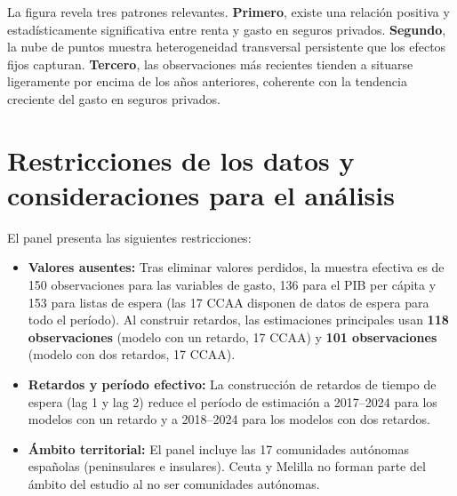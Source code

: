 La figura revela tres patrones relevantes. \textbf{Primero}, existe una relación
positiva y estadísticamente significativa entre renta y gasto en seguros privados.
\textbf{Segundo}, la nube de puntos muestra heterogeneidad transversal persistente
que los efectos fijos capturan. \textbf{Tercero}, las observaciones más recientes
tienden a situarse ligeramente por encima de los años anteriores, coherente con la
tendencia creciente del gasto en seguros privados.

\section{Restricciones de los datos y consideraciones para el análisis}

El panel presenta las siguientes restricciones:

\begin{itemize}
  \item \textbf{Valores ausentes:} Tras eliminar valores perdidos, la muestra
    efectiva es de 150 observaciones para las variables de gasto, 136 para el PIB
    per cápita y 153 para listas de espera (las 17 CCAA disponen de datos de
    espera para todo el período). Al construir retardos, las estimaciones
    principales usan \textbf{118 observaciones} (modelo con un retardo, 17 CCAA)
    y \textbf{101 observaciones} (modelo con dos retardos, 17 CCAA).
  \item \textbf{Retardos y período efectivo:} La construcción de retardos de tiempo
    de espera (lag 1 y lag 2) reduce el período de estimación a 2017--2024 para los
    modelos con un retardo y a 2018--2024 para los modelos con dos retardos.
  \item \textbf{Ámbito territorial:} El panel incluye las 17 comunidades
    autónomas españolas (peninsulares e insulares). Ceuta y Melilla no forman
    parte del ámbito del estudio al no ser comunidades autónomas.
\end{itemize}
